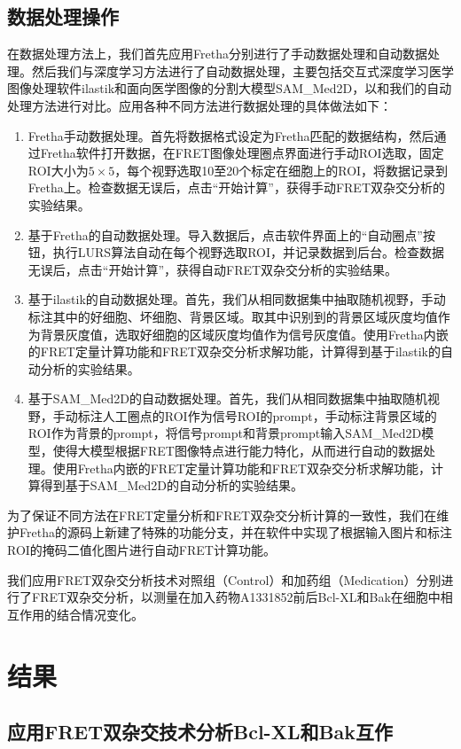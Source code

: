 \subsection{数据处理操作}
在数据处理方法上，我们首先应用Fretha分别进行了手动数据处理和自动数据处理。然后我们与深度学习方法进行了自动数据处理，主要包括交互式深度学习医学图像处理软件ilastik和面向医学图像的分割大模型SAM\_Med2D，以和我们的自动处理方法进行对比。应用各种不同方法进行数据处理的具体做法如下：
\begin{enumerate}
    \item Fretha手动数据处理。首先将数据格式设定为Fretha匹配的数据结构，然后通过Fretha软件打开数据，在FRET图像处理圈点界面进行手动ROI选取，固定ROI大小为$5\times 5$，每个视野选取10至20个标定在细胞上的ROI，将数据记录到Fretha上。检查数据无误后，点击“开始计算”，获得手动FRET双杂交分析的实验结果。
    \item 基于Fretha的自动数据处理。导入数据后，点击软件界面上的“自动圈点”按钮，执行LURS算法自动在每个视野选取ROI，并记录数据到后台。检查数据无误后，点击“开始计算”，获得自动FRET双杂交分析的实验结果。
    \item 基于ilastik的自动数据处理。首先，我们从相同数据集中抽取随机视野，手动标注其中的好细胞、坏细胞、背景区域。取其中识别到的背景区域灰度均值作为背景灰度值，选取好细胞的区域灰度均值作为信号灰度值。使用Fretha内嵌的FRET定量计算功能和FRET双杂交分析求解功能，计算得到基于ilastik的自动分析的实验结果。
    \item 基于SAM\_Med2D的自动数据处理。首先，我们从相同数据集中抽取随机视野，手动标注人工圈点的ROI作为信号ROI的prompt，手动标注背景区域的ROI作为背景的prompt，将信号prompt和背景prompt输入SAM\_Med2D模型，使得大模型根据FRET图像特点进行能力特化，从而进行自动的数据处理。使用Fretha内嵌的FRET定量计算功能和FRET双杂交分析求解功能，计算得到基于SAM\_Med2D的自动分析的实验结果。
\end{enumerate}
为了保证不同方法在FRET定量分析和FRET双杂交分析计算的一致性，我们在维护Fretha的源码上新建了特殊的功能分支，并在软件中实现了根据输入图片和标注ROI的掩码二值化图片进行自动FRET计算功能。

我们应用FRET双杂交分析技术对照组（Control）和加药组（Medication）分别进行了FRET双杂交分析，以测量在加入药物A1331852前后Bcl-XL和Bak在细胞中相互作用的结合情况变化。

\section{结果}

\subsection{应用FRET双杂交技术分析Bcl-XL和Bak互作}

